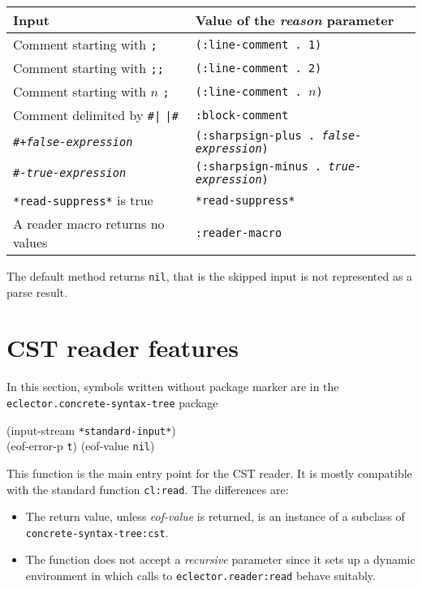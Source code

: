 \begin{tabular}{ll}
  Input                                          & Value of the \textit{reason} parameter\\
  \hline
  Comment starting with \texttt{;}               & \texttt{(:line-comment~.~1)}\\
  Comment starting with \texttt{;;}              & \texttt{(:line-comment~.~2)}\\
  Comment starting with $n$ \texttt{;}           & \texttt{(:line-comment~.~$n$)}\\
  Comment delimited by \texttt{\#|} \texttt{|\#} & \texttt{:block-comment}\\
  \texttt{\#+\textit{false-expression}}          & \texttt{(:sharpsign-plus~.~\textit{false-expression})}\\
  \texttt{\#-\textit{true-expression}}           & \texttt{(:sharpsign-minus~.~\textit{true-expression})}\\
  \texttt{*read-suppress*} is true               & \texttt{*read-suppress*}\\
  A reader macro returns no values               & \texttt{:reader-macro}
\end{tabular}

The default method returns \texttt{nil}, that is the skipped input is
not represented as a parse result.

\section{CST reader features}
\label{sec:cst-reader-features}

In this section, symbols written without package marker are in the
\texttt{eclector.concrete-syntax-tree} package

 {\optional (input-stream \texttt{*standard-input*})\\
  (eof-error-p \texttt{t})
  (eof-value \texttt{nil})}

This function is the main entry point for the CST reader.  It is
mostly compatible with the standard \commonlisp{} function
\texttt{cl:read}.  The differences are:

\begin{itemize}
\item The return value, unless \textit{eof-value} is returned, is an
  instance of a subclass of \texttt{concrete-syntax-tree:cst}.
\item The function does not accept a \textit{recursive} parameter
  since it sets up a dynamic environment in which calls to
  \texttt{eclector.reader:read} behave suitably.
\end{itemize}

